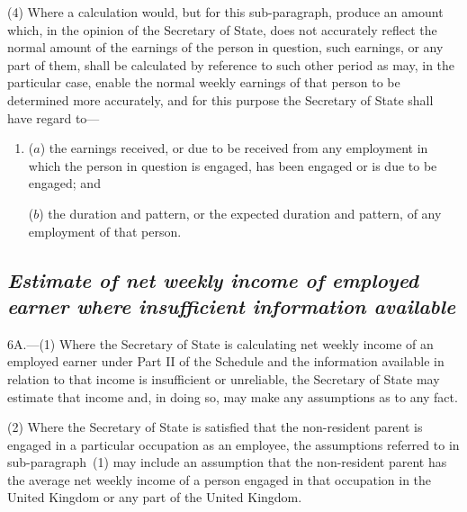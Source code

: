 \documentclass[12pt,a4paper]{article}
\begin{document}
(4) Where a calculation would, but for this sub-paragraph, produce an amount which, in the opinion of the Secretary of State, does not accurately reflect the normal amount of the earnings of the person in question, such earnings, or any part of them, shall be calculated by reference to such other period as may, in the particular case, enable the normal weekly earnings of that person to be determined more accurately, and for this purpose the Secretary of State shall have regard to—
\begin{enumerate}\item[]
($a$) the earnings received, or due to be received from any employment in which the person in question is engaged, has been engaged or is due to be engaged; and

($b$) the duration and pattern, or the expected duration and pattern, of any employment of that person.
\end{enumerate}


\subsection*{\sloppy\itshape Estimate of net weekly income of employed earner where insufficient information available}

6A.---(1)  Where the 
Secretary of State  %
is calculating net weekly income of an employed earner under Part II of the Schedule and the information available in relation to that income is insufficient or unreliable, the 
Secretary of State  %
may estimate that income and, in doing so, may make any assumptions as to any fact.

(2) Where the 
Secretary of State  %
is satisfied that the non-resident parent is engaged in a particular occupation as an employee, the assumptions referred to in sub-paragraph~(1) may include an assumption that the non-resident parent has the average net weekly income of a person engaged in that occupation in the United Kingdom or any part of the United Kingdom.
\end{document}
